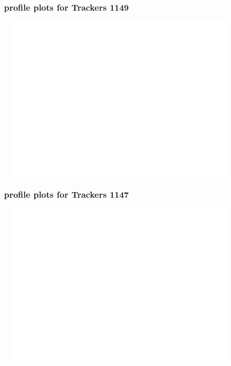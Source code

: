 \documentclass[slidestop,compress,mathserif]{beamer}
\begin{document}
\begin{frame}\frametitle{profile plots for Trackers 1149}
	 \includegraphics[width=12cm,height=8cm]{profile_plots_for_Trackers_1149.pdf}
\end{frame}
\begin{frame}\frametitle{profile plots for Trackers 1147}
	 \includegraphics[width=12cm,height=8cm]{profile_plots_for_Trackers_1147.pdf}
\end{frame}
\end{document}
